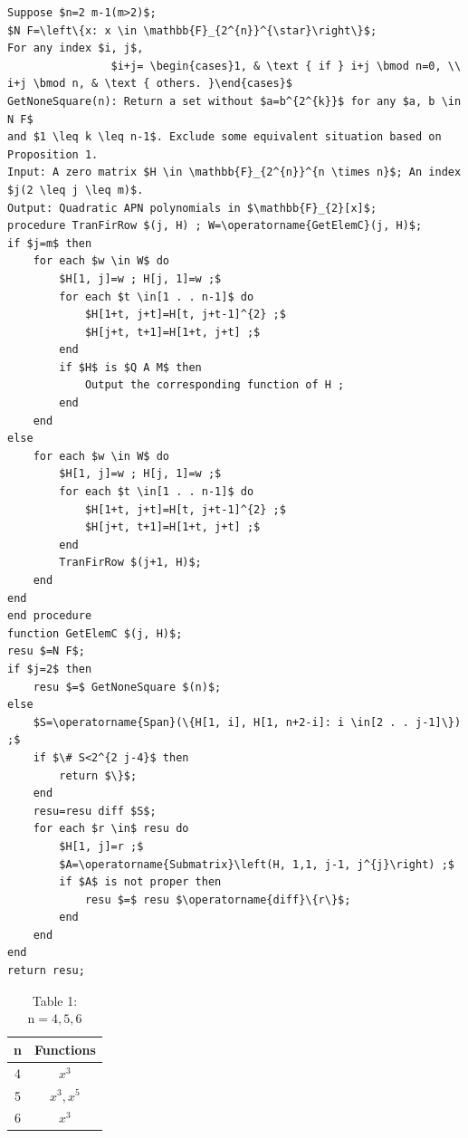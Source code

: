 \documentclass[10pt]{article}
\begin{document}
\begin{verbatim}
Suppose $n=2 m-1(m>2)$;
$N F=\left\{x: x \in \mathbb{F}_{2^{n}}^{\star}\right\}$;
For any index $i, j$,
                $i+j= \begin{cases}1, & \text { if } i+j \bmod n=0, \\ i+j \bmod n, & \text { others. }\end{cases}$
GetNoneSquare(n): Return a set without $a=b^{2^{k}}$ for any $a, b \in N F$
and $1 \leq k \leq n-1$. Exclude some equivalent situation based on
Proposition 1.
Input: A zero matrix $H \in \mathbb{F}_{2^{n}}^{n \times n}$; An index $j(2 \leq j \leq m)$.
Output: Quadratic APN polynomials in $\mathbb{F}_{2}[x]$;
procedure TranFirRow $(j, H) ; W=\operatorname{GetElemC}(j, H)$;
if $j=m$ then
    for each $w \in W$ do
        $H[1, j]=w ; H[j, 1]=w ;$
        for each $t \in[1 . . n-1]$ do
            $H[1+t, j+t]=H[t, j+t-1]^{2} ;$
            $H[j+t, t+1]=H[1+t, j+t] ;$
        end
        if $H$ is $Q A M$ then
            Output the corresponding function of H ;
        end
    end
else
    for each $w \in W$ do
        $H[1, j]=w ; H[j, 1]=w ;$
        for each $t \in[1 . . n-1]$ do
            $H[1+t, j+t]=H[t, j+t-1]^{2} ;$
            $H[j+t, t+1]=H[1+t, j+t] ;$
        end
        TranFirRow $(j+1, H)$;
    end
end
end procedure
function GetElemC $(j, H)$;
resu $=N F$;
if $j=2$ then
    resu $=$ GetNoneSquare $(n)$;
else
    $S=\operatorname{Span}(\{H[1, i], H[1, n+2-i]: i \in[2 . . j-1]\}) ;$
    if $\# S<2^{2 j-4}$ then
        return $\}$;
    end
    resu=resu diff $S$;
    for each $r \in$ resu do
        $H[1, j]=r ;$
        $A=\operatorname{Submatrix}\left(H, 1,1, j-1, j^{j}\right) ;$
        if $A$ is not proper then
            resu $=$ resu $\operatorname{diff}\{r\}$;
        end
    end
end
return resu;
\end{verbatim}

\begin{table}[h]
\begin{center}
\captionsetup{labelformat=empty}
\caption{Table 1: $\mathrm{n}=4,5,6$}
\begin{tabular}{|c|c|}
\hline
n & Functions \\
\hline
4 & $x^{3}$ \\
\hline
5 & $x^{3}, x^{5}$ \\
\hline
6 & $x^{3}$ \\
\hline
\end{tabular}
\end{center}
\end{table}
\end{document}
